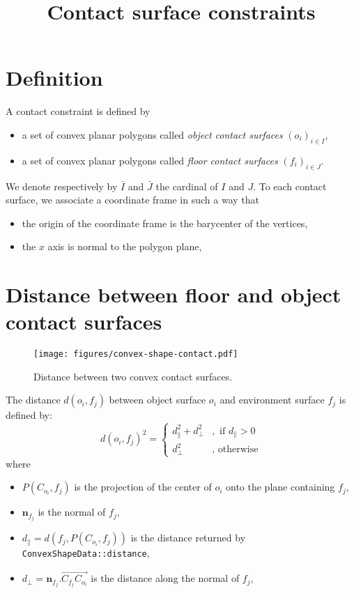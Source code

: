 \documentclass {article}
\title {Contact surface constraints}
\begin{document}
\maketitle

\section {Definition}

A contact constraint is defined by
\begin{itemize}
\item a set of convex planar polygons called \textit{object contact surfaces}
  $(o_i)_{i\in I}$,
\item a set of convex planar polygons called \textit{floor contact surfaces}
  $(f_i)_{i\in J}$.
\end{itemize}
We denote respectively by $\bar{I}$ and $\bar{J}$ the cardinal of $I$ and $J$.
To each contact surface, we associate a coordinate frame in such a way that
\begin{itemize}
\item the origin of the coordinate frame is the barycenter of the vertices,
\item the $x$ axis is normal to the polygon plane,
\end{itemize}
\section {Distance between floor and object contact surfaces}
\begin{figure}
  \centerline {
    \texttt{[image: figures/convex-shape-contact.pdf]}
  }
  \caption{Distance between two convex contact surfaces.}
  \label{fig:distance}
\end{figure}

The distance $d(o_i, f_j)$ between object surface $o_i$ and
environment surface $ f_j $ is defined by:
\begin{equation*}
  d(o_i,f_j)^2 =
  \left\lbrace \begin{array}{cl}
    d_{\parallel}^2 + d_{\perp}^2 &, \text{ if } d_{\parallel} > 0 \\
    d_{\perp}^2                   &, \text{ otherwise}
  \end{array} \right.
\end{equation*}
where
\begin{itemize}
\item $P (C_{o_i}, f_j)$ is the projection of the center of $o_i$ onto the plane containing $ f_j $,
\item $\mathbf{n}_{f_j}$ is the normal of $ f_j $,
\item $d_{\parallel} = d(f_j, P (C_{o_i}, f_j))$ is the distance returned by \texttt{ConvexShapeData::distance},
\item $d_{\perp} = \mathbf{n}_{f_j}.\vec{C_{f_j} C_{o_i}}$ is the distance along the normal of $ f_j $,
\end{itemize}
\end{document}
